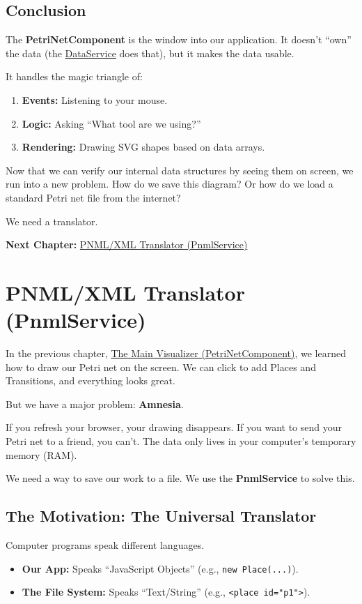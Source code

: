 \documentclass[a4paper,11pt,oneside]{report}
\begin{document}
\section{Conclusion}

The \textbf{PetriNetComponent} is the window into our application. It doesn't ``own'' the data (the \hyperref[chap:dataservice]{DataService} does that), but it makes the data usable.

It handles the magic triangle of:
\begin{enumerate}
    \item \textbf{Events:} Listening to your mouse.
    \item \textbf{Logic:} Asking ``What tool are we using?''
    \item \textbf{Rendering:} Drawing SVG shapes based on data arrays.
\end{enumerate}

Now that we can verify our internal data structures by seeing them on screen, we run into a new problem. How do we save this diagram? Or how do we load a standard Petri net file from the internet?

We need a translator.

\textbf{Next Chapter:} \hyperref[chap:pnmlservice]{PNML/XML Translator (PnmlService)}

\chapter{PNML/XML Translator (PnmlService)}
\label{chap:pnmlservice}

In the previous chapter, \hyperref[chap:visualizer]{The Main Visualizer (PetriNetComponent)}, we learned how to draw our Petri net on the screen. We can click to add Places and Transitions, and everything looks great.

But we have a major problem: \textbf{Amnesia}.

If you refresh your browser, your drawing disappears. If you want to send your Petri net to a friend, you can't. The data only lives in your computer's temporary memory (RAM).

We need a way to save our work to a file. We use the \textbf{PnmlService} to solve this.

\section{The Motivation: The Universal Translator}

Computer programs speak different languages.
\begin{itemize}
    \item \textbf{Our App:} Speaks ``JavaScript Objects'' (e.g., \texttt{new Place(...)}).
    \item \textbf{The File System:} Speaks ``Text/String'' (e.g., \texttt{<place id="p1">}).
\end{itemize}
\end{document}
